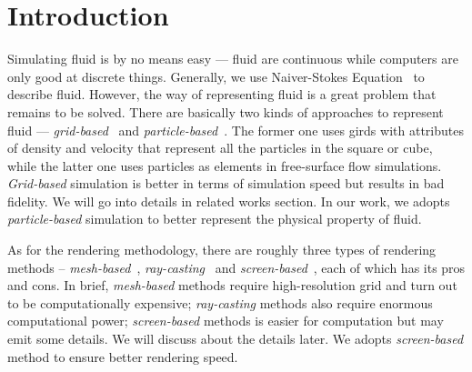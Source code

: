 \documentclass[sigconf]{acmart}
\begin{document}


\maketitle

\section{Introduction}
Simulating fluid is by no means easy --- fluid are continuous while computers are only good at discrete things.
Generally, we use Naiver-Stokes Equation~\cite{navier1838navier} to describe fluid.
However, the way of representing fluid is a great problem that remains to be solved.
There are basically two kinds of approaches to represent fluid --- \textit{grid-based}~\cite{harlow1965numerical, foster2001practical} and \textit{particle-based}~\cite{monaghan1992smoothed, muller2003particle, antoci2007numerical, solenthaler2009predictive, macklin2013position}.
The former one uses girds with attributes of density and velocity that represent all the particles in the square or cube, while the latter one uses particles as elements in free-surface flow simulations.
\textit{Grid-based} simulation is better in terms of simulation speed but results in bad fidelity.
We will go into details in related works section.
In our work, we adopts \textit{particle-based} simulation to better represent the physical property of fluid.

As for the rendering methodology, there are roughly three types of rendering methods -- \textit{mesh-based}~\cite{solenthaler2007unified, adams2007adaptively}, \textit{ray-casting}~\cite{fraedrich2010efficient, zirr2015memory} and \textit{screen-based}~\cite{cords2009interactive, bagar2010layered, oliveira2022narrow}, each of which has its pros and cons. In brief, \textit{mesh-based} methods require high-resolution grid and turn out to be computationally expensive; \textit{ray-casting} methods also require enormous computational power; \textit{screen-based} methods is easier for computation but may emit some details. We will discuss about the details later. We adopts \textit{screen-based} method to ensure better rendering speed.
\end{document}
